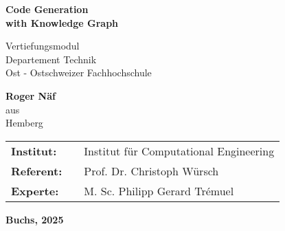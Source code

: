 \thispagestyle{empty}

\vspace*{0.5cm}

\begin{center}
\LARGE{\textbf{
	Code Generation \\
	with Knowledge Graph  \\
			}}
\end{center}
	
\vspace*{2.5cm}

\begin{center}
\large{	
Vertiefungsmodul \\
Departement Technik                     \\
Ost - Ostschweizer Fachhochschule} 
\end{center}

\vspace*{1.5cm}
 
\begin{center}
\large{\textbf{Roger Näf}            \\
aus                                         \\
Hemberg }
\end{center}

\vspace*{2.5cm}

\begin{tabular}{lll}
	\large{\textbf{Institut:}}          & & \large{Institut für Computational Engineering} \\[2mm]
	\large{\textbf{Referent:}}          & & \large{Prof. Dr. Christoph Würsch}      \\[2mm]
	\large{\textbf{Experte:}}           & & \large{M. Sc. Philipp Gerard Trémuel}                   \\[2mm]
\end{tabular}

\vspace*{1.0cm}
\begin{center}
\large{\textbf{Buchs, 2025}}
\end{center}